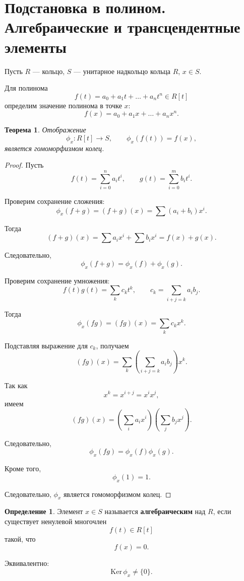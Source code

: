 \documentclass[12pt, a4paper]{article}
\newtheorem{theorem}{Теорема}
\theoremstyle{definition}
\newtheorem{definition}{Определение}
\theoremstyle{remark}
\newcommand{\Ker}{\mathrm{Ker}\,}
\begin{document}
\section{Подстановка в полином. Алгебраические и трансцендентные элементы}

Пусть $R$ --- кольцо, $S$ --- унитарное надкольцо кольца $R$,
$x \in S$.

Для полинома
\[
f(t)=a_0+a_1t+\dots+a_nt^n \in R[t]
\]
определим значение полинома в точке $x$:
\[
f(x)=a_0+a_1x+\dots+a_nx^n.
\]

\begin{theorem}
	Отображение
	\[
	\phi_x:R[t]\to S,
	\qquad
	\phi_x(f(t))=f(x),
	\]
	является гомоморфизмом колец.
\end{theorem}

\begin{proof}
	Пусть
	\[
	f(t)=\sum_{i=0}^n a_it^i,
	\qquad
	g(t)=\sum_{i=0}^m b_it^i.
	\]
	
	Проверим сохранение сложения:
	\[
	\phi_x(f+g)
	=
	(f+g)(x)
	=
	\sum (a_i+b_i)x^i.
	\]
	
	Тогда
	\[
	(f+g)(x)
	=
	\sum a_ix^i+\sum b_ix^i
	=
	f(x)+g(x).
	\]
	
	Следовательно,
	\[
	\phi_x(f+g)=\phi_x(f)+\phi_x(g).
	\]
	
	Проверим сохранение умножения:
	\[
	f(t)g(t)=\sum_k c_k t^k,
	\qquad
	c_k=\sum_{i+j=k} a_i b_j.
	\]
	
	Тогда
	\[
	\phi_x(fg)
	=
	(fg)(x)
	=
	\sum_k c_k x^k.
	\]
	
	Подставляя выражение для $c_k$, получаем
	\[
	(fg)(x)
	=
	\sum_k \left(\sum_{i+j=k} a_i b_j\right)x^k.
	\]
	
	Так как
	\[
	x^k=x^{i+j}=x^i x^j,
	\]
	имеем
	\[
	(fg)(x)
	=
	\left(\sum_i a_i x^i\right)
	\left(\sum_j b_j x^j\right).
	\]
	
	Следовательно,
	\[
	\phi_x(fg)=\phi_x(f)\phi_x(g).
	\]
	
	Кроме того,
	\[
	\phi_x(1)=1.
	\]
	
	Следовательно, $\phi_x$ является гомоморфизмом колец.
\end{proof}

\begin{definition}
	Элемент $x \in S$ называется \textbf{алгебраическим} над $R$,
	если существует ненулевой многочлен
	\[
	f(t)\in R[t]
	\]
	такой, что
	\[
	f(x)=0.
	\]
	
	Эквивалентно:
	\[
	\Ker \phi_x \ne \{0\}.
	\]
\end{definition}
\end{document}
